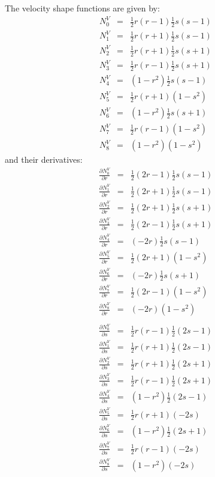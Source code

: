 The velocity shape functions are given by:
\begin{eqnarray}
N^V_0&=& \frac{1}{2}r(r-1)  \frac{1}{2}s(s-1)\nonumber\\
N^V_1&=& \frac{1}{2}r(r+1)  \frac{1}{2}s(s-1)\nonumber\\
N^V_2&=& \frac{1}{2}r(r+1)  \frac{1}{2}s(s+1)\nonumber\\
N^V_3&=& \frac{1}{2}r(r-1)  \frac{1}{2}s(s+1)\nonumber\\
N^V_4&=&     (1-r^2)  \frac{1}{2}s(s-1)\nonumber\\
N^V_5&=& \frac{1}{2}r(r+1)      (1-s^2)\nonumber\\
N^V_6&=&     (1-r^2)  \frac{1}{2}s(s+1)\nonumber\\
N^V_7&=& \frac{1}{2}r(r-1)      (1-s^2)\nonumber\\
N^V_8&=&     (1-r^2)      (1-s^2)\nonumber
\end{eqnarray}
and their derivatives:
\begin{eqnarray}
\frac{\partial N^V_0}{\partial r}&=& \frac{1}{2}(2r-1)  \frac{1}{2}s(s-1)\nonumber\\
\frac{\partial N^V_1}{\partial r}&=& \frac{1}{2}(2r+1)  \frac{1}{2}s(s-1)\nonumber\\
\frac{\partial N^V_2}{\partial r}&=& \frac{1}{2}(2r+1)  \frac{1}{2}s(s+1)\nonumber\\
\frac{\partial N^V_3}{\partial r}&=& \frac{1}{2}(2r-1)  \frac{1}{2}s(s+1)\nonumber\\
\frac{\partial N^V_4}{\partial r}&=&       (-2r)  \frac{1}{2}s(s-1)\nonumber\\
\frac{\partial N^V_5}{\partial r}&=& \frac{1}{2}(2r+1)     (1-s^2)\nonumber\\
\frac{\partial N^V_6}{\partial r}&=&       (-2r)  \frac{1}{2}s(s+1)\nonumber\\
\frac{\partial N^V_7}{\partial r}&=& \frac{1}{2}(2r-1)     (1-s^2)\nonumber\\
\frac{\partial N^V_8}{\partial r}&=&       (-2r)     (1-s^2)\nonumber  \\ \nonumber\\
\frac{\partial N^V_0}{\partial s}&=& \frac{1}{2}r(r-1)  \frac{1}{2}(2s-1)\nonumber\\
\frac{\partial N^V_1}{\partial s}&=& \frac{1}{2}r(r+1)  \frac{1}{2}(2s-1)\nonumber\\
\frac{\partial N^V_2}{\partial s}&=& \frac{1}{2}r(r+1)  \frac{1}{2}(2s+1)\nonumber\\
\frac{\partial N^V_3}{\partial s}&=& \frac{1}{2}r(r-1)  \frac{1}{2}(2s+1)\nonumber\\
\frac{\partial N^V_4}{\partial s}&=&     (1-r^2)  \frac{1}{2}(2s-1)\nonumber\\
\frac{\partial N^V_5}{\partial s}&=& \frac{1}{2}r(r+1)        (-2s)\nonumber\\
\frac{\partial N^V_6}{\partial s}&=&     (1-r^2)  \frac{1}{2}(2s+1)\nonumber\\
\frac{\partial N^V_7}{\partial s}&=& \frac{1}{2}r(r-1)        (-2s)\nonumber\\
\frac{\partial N^V_8}{\partial s}&=&     (1-r^2)        (-2s)\nonumber
\end{eqnarray}

